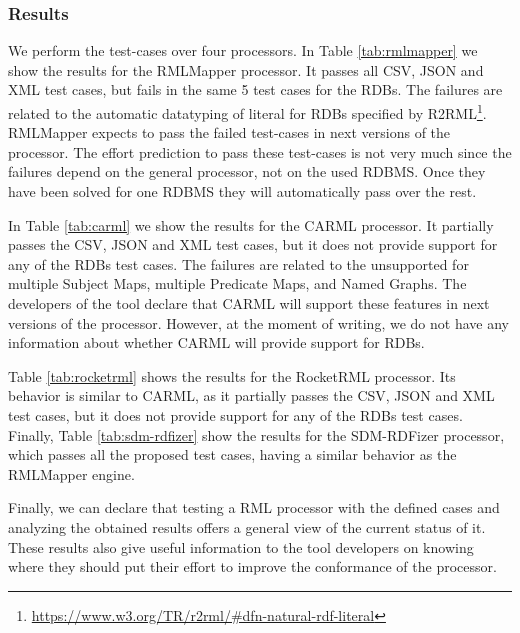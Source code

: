 \subsubsection{Results}
We perform the test-cases over four processors. In Table \ref{tab:rmlmapper} we show the results for the RMLMapper processor. It passes all CSV, JSON and XML test cases, but fails in the same 5 test cases for the RDBs. The failures are related to the automatic datatyping of literal for RDBs specified by R2RML\footnote{\url{https://www.w3.org/TR/r2rml/\#dfn-natural-rdf-literal}}. RMLMapper expects to pass the failed test-cases in next versions of the processor. The effort prediction to pass these test-cases is not very much since the failures depend on the general processor, not on the used RDBMS. Once they have been solved for one RDBMS they will automatically pass over the rest.

In Table \ref{tab:carml} we show the results for the CARML processor. It partially passes the CSV, JSON and XML test cases, but it does not provide support for any of the RDBs test cases. The failures are related to the unsupported for multiple Subject Maps, multiple Predicate Maps, and Named Graphs. The developers of the tool declare that CARML will support these features in next versions of the processor. However, at the moment of writing, we do not have any information about whether CARML will provide support for RDBs.

Table \ref{tab:rocketrml} shows the results for the RocketRML processor. Its behavior is similar to CARML, as it partially passes the CSV, JSON and XML test cases, but it does not provide support for any of the RDBs test cases. Finally, Table \ref{tab:sdm-rdfizer} show the results for the SDM-RDFizer processor, which passes all the proposed test cases, having a similar behavior as the RMLMapper engine.

Finally, we can declare that testing a RML processor with the defined cases and analyzing the obtained results offers a general view of the current status of it. These results also give useful information to the tool developers on knowing where they should put their effort to improve the conformance of the processor.

